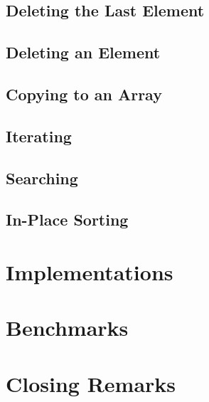 \documentclass{article}
\begin{document}
	\subsection{Deleting the Last Element}
	
	\subsection{Deleting an Element}
	
	\subsection{Copying to an Array}
	
	\subsection{Iterating}
	
	\subsection{Searching}
	
	\subsection{In-Place Sorting}
	
	\section{Implementations}
	
	\section{Benchmarks}
	
	\section{Closing Remarks}
\end{document}
